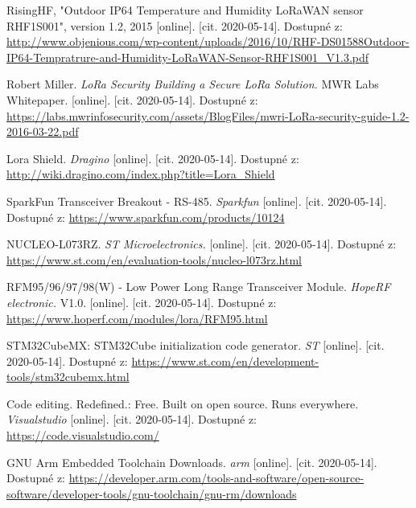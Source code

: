 \begin{thebibliography}{9}
RisingHF, "Outdoor IP64 Temperature and Humidity LoRaWAN sensor RHF1S001", version 1.2, 2015
[online]. [cit. 2020-05-14]. Dostupné z: 
\url{
http://www.objenious.com/wp-content/uploads/2016/10/RHF-DS01588Outdoor-IP64-Tempratrure-and-Humidity-LoRaWAN-Sensor-RHF1S001_V1.3.pdf
}
 

Robert Miller.
\textit{
LoRa Security
Building a Secure LoRa Solution.
}
MWR Labs Whitepaper.
[online]. [cit. 2020-05-14]. Dostupné z: 
\url{
https://labs.mwrinfosecurity.com/assets/BlogFiles/mwri-LoRa-security-guide-1.2-2016-03-22.pdf
}

Lora Shield.
\textit{
Dragino
}
[online]. [cit. 2020-05-14]. Dostupné z: 
\url{
http://wiki.dragino.com/index.php?title=Lora_Shield
}

SparkFun Transceiver Breakout - RS-485.
\textit{
Sparkfun
}
[online]. [cit. 2020-05-14]. Dostupné z: 
\url{
https://www.sparkfun.com/products/10124
}

NUCLEO-L073RZ.
\textit{
ST Microelectronics.
}
[online]. [cit. 2020-05-14]. Dostupné z: 
\url{
https://www.st.com/en/evaluation-tools/nucleo-l073rz.html
}


RFM95/96/97/98(W) - Low Power Long Range Transceiver Module.
\textit{ HopeRF electronic. }
V1.0.
[online]. [cit. 2020-05-14]. Dostupné z: 
\url{
https://www.hoperf.com/modules/lora/RFM95.html
}



STM32CubeMX: STM32Cube initialization code generator. \textit{ ST } [online]. [cit. 2020-05-14]. Dostupné z: 
\url{
https://www.st.com/en/development-tools/stm32cubemx.html
}

Code editing. Redefined.: Free. Built on open source. Runs everywhere. \textit{ Visualstudio } [online]. [cit. 2020-05-14]. Dostupné z: 
\url{
https://code.visualstudio.com/
}

GNU Arm Embedded Toolchain Downloads. \textit{ arm } [online]. [cit. 2020-05-14]. Dostupné z:
\url{
https://developer.arm.com/tools-and-software/open-source-software/developer-tools/gnu-toolchain/gnu-rm/downloads
}


\end{thebibliography}

